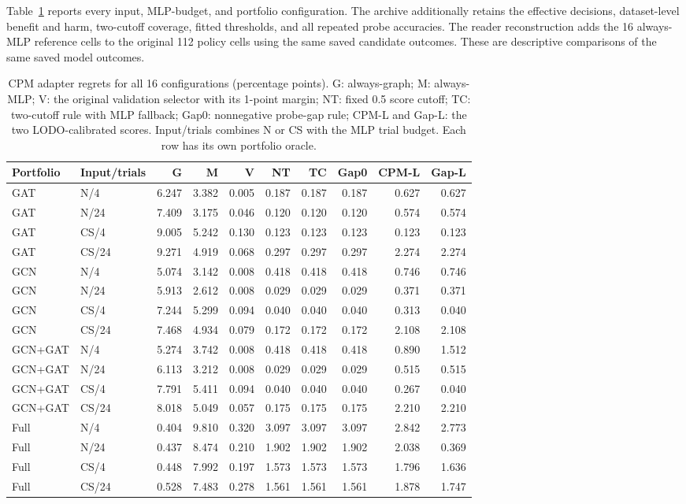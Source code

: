 Table~\ref{tab:cpm_all} reports every input, MLP-budget, and portfolio configuration. The archive additionally retains the effective decisions, dataset-level benefit and harm, two-cutoff coverage, fitted thresholds, and all repeated probe accuracies. The reader reconstruction adds the 16 always-MLP reference cells to the original 112 policy cells using the same saved candidate outcomes. These are descriptive comparisons of the same saved model outcomes.

\begin{table}[tbp]
\centering
\caption{CPM adapter regrets for all 16 configurations (percentage points). G: always-graph; M: always-MLP; V: the original validation selector with its 1-point margin; NT: fixed 0.5 score cutoff; TC: two-cutoff rule with MLP fallback; Gap0: nonnegative probe-gap rule; CPM-L and Gap-L: the two LODO-calibrated scores. Input/trials combines N or CS with the MLP trial budget. Each row has its own portfolio oracle.}
\label{tab:cpm_all}
\footnotesize
\setlength{\tabcolsep}{2pt}
\begin{tabular}{@{}llrrrrrrrr@{}}
\toprule
Portfolio & Input/trials & G & M & V & NT & TC & Gap0 & CPM-L & Gap-L \\
\midrule
GAT & N/4 & 6.247 & 3.382 & 0.005 & 0.187 & 0.187 & 0.187 & 0.627 & 0.627 \\
GAT & N/24 & 7.409 & 3.175 & 0.046 & 0.120 & 0.120 & 0.120 & 0.574 & 0.574 \\
GAT & CS/4 & 9.005 & 5.242 & 0.130 & 0.123 & 0.123 & 0.123 & 0.123 & 0.123 \\
GAT & CS/24 & 9.271 & 4.919 & 0.068 & 0.297 & 0.297 & 0.297 & 2.274 & 2.274 \\
GCN & N/4 & 5.074 & 3.142 & 0.008 & 0.418 & 0.418 & 0.418 & 0.746 & 0.746 \\
GCN & N/24 & 5.913 & 2.612 & 0.008 & 0.029 & 0.029 & 0.029 & 0.371 & 0.371 \\
GCN & CS/4 & 7.244 & 5.299 & 0.094 & 0.040 & 0.040 & 0.040 & 0.313 & 0.040 \\
GCN & CS/24 & 7.468 & 4.934 & 0.079 & 0.172 & 0.172 & 0.172 & 2.108 & 2.108 \\
GCN+GAT & N/4 & 5.274 & 3.742 & 0.008 & 0.418 & 0.418 & 0.418 & 0.890 & 1.512 \\
GCN+GAT & N/24 & 6.113 & 3.212 & 0.008 & 0.029 & 0.029 & 0.029 & 0.515 & 0.515 \\
GCN+GAT & CS/4 & 7.791 & 5.411 & 0.094 & 0.040 & 0.040 & 0.040 & 0.267 & 0.040 \\
GCN+GAT & CS/24 & 8.018 & 5.049 & 0.057 & 0.175 & 0.175 & 0.175 & 2.210 & 2.210 \\
Full & N/4 & 0.404 & 9.810 & 0.320 & 3.097 & 3.097 & 3.097 & 2.842 & 2.773 \\
Full & N/24 & 0.437 & 8.474 & 0.210 & 1.902 & 1.902 & 1.902 & 2.038 & 0.369 \\
Full & CS/4 & 0.448 & 7.992 & 0.197 & 1.573 & 1.573 & 1.573 & 1.796 & 1.636 \\
Full & CS/24 & 0.528 & 7.483 & 0.278 & 1.561 & 1.561 & 1.561 & 1.878 & 1.747 \\
\bottomrule
\end{tabular}
\end{table}

